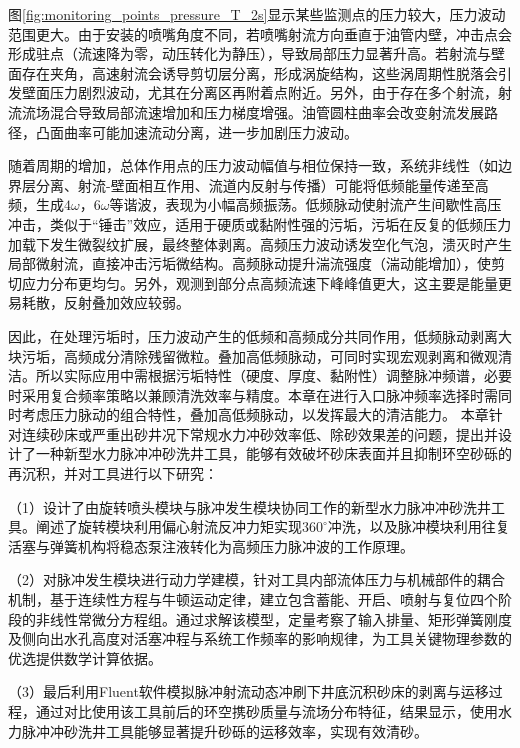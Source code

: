 图\ref{fig:monitoring_points_pressure_T_2s}显示某些监测点的压力较大，压力波动范围更大。由于安装的喷嘴角度不同，若喷嘴射流方向垂直于油管内壁，冲击点会形成驻点（流速降为零，动压转化为静压），导致局部压力显著升高。若射流与壁面存在夹角，高速射流会诱导剪切层分离，形成涡旋结构，这些涡周期性脱落会引发壁面压力剧烈波动，尤其在分离区再附着点附近。另外，由于存在多个射流，射流流场混合导致局部流速增加和压力梯度增强。油管圆柱曲率会改变射流发展路径，凸面曲率可能加速流动分离，进一步加剧压力波动。

随着周期的增加，总体作用点的压力波动幅值与相位保持一致，系统非线性（如边界层分离、射流-壁面相互作用、流道内反射与传播）可能将低频能量传递至高频，生成$4\omega$，$6\omega$等谐波，表现为小幅高频振荡。低频脉动使射流产生间歇性高压冲击，类似于“锤击”效应，适用于硬质或黏附性强的污垢，污垢在反复的低频压力加载下发生微裂纹扩展，最终整体剥离。高频压力波动诱发空化气泡，溃灭时产生局部微射流，直接冲击污垢微结构。高频脉动提升湍流强度（湍动能增加），使剪切应力分布更均匀。另外，观测到部分点高频流速下峰峰值更大，这主要是能量更易耗散，反射叠加效应较弱。

因此，在处理污垢时，压力波动产生的低频和高频成分共同作用，低频脉动剥离大块污垢，高频成分清除残留微粒。叠加高低频脉动，可同时实现宏观剥离和微观清洁。所以实际应用中需根据污垢特性（硬度、厚度、黏附性）调整脉冲频谱，必要时采用复合频率策略以兼顾清洗效率与精度。本章在进行入口脉冲频率选择时需同时考虑压力脉动的组合特性，叠加高低频脉动，以发挥最大的清洁能力。
本章针对连续砂床或严重出砂井况下常规水力冲砂效率低、除砂效果差的问题，提出并设计了一种新型水力脉冲冲砂洗井工具，能够有效破坏砂床表面并且抑制环空砂砾的再沉积，并对工具进行以下研究：

（1）设计了由旋转喷头模块与脉冲发生模块协同工作的新型水力脉冲冲砂洗井工具。阐述了旋转模块利用偏心射流反冲力矩实现$360^\circ$冲洗，以及脉冲模块利用往复活塞与弹簧机构将稳态泵注液转化为高频压力脉冲波的工作原理。

（2）对脉冲发生模块进行动力学建模，针对工具内部流体压力与机械部件的耦合机制，基于连续性方程与牛顿运动定律，建立包含蓄能、开启、喷射与复位四个阶段的非线性常微分方程组。通过求解该模型，定量考察了输入排量、矩形弹簧刚度及侧向出水孔高度对活塞冲程与系统工作频率的影响规律，为工具关键物理参数的优选提供数学计算依据。

（3）最后利用Fluent软件模拟脉冲射流动态冲刷下井底沉积砂床的剥离与运移过程，通过对比使用该工具前后的环空携砂质量与流场分布特征，结果显示，使用水力脉冲冲砂洗井工具能够显著提升砂砾的运移效率，实现有效清砂。
